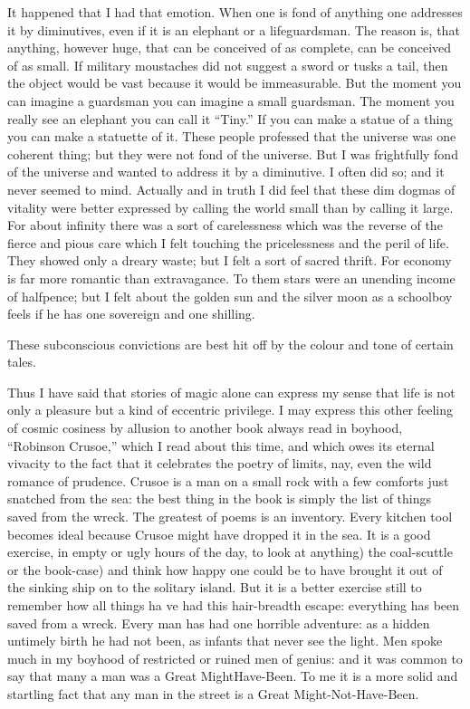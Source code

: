 \documentclass{book}
\begin{document}
It happened that I had that emotion. When one is fond of anything one addresses it by diminutives, even if it is an elephant or a lifeguardsman. The reason is, that anything, however huge, that can be conceived of as complete, can be conceived of as small. If military moustaches did not suggest a sword or tusks a tail, then the object would be vast because it would be immeasurable. But the moment you can imagine a guardsman you can imagine a small guardsman. The moment you really see an elephant you can call it “Tiny.” If you can make a statue of a thing you can make a statuette of it. These people professed that the universe was one coherent thing; but they were not fond of the universe. But I was frightfully fond of the universe and wanted to address it by a diminutive. I often did so; and it never seemed to mind. Actually and in truth I did feel that these dim dogmas of vitality were better expressed by calling the world small than by calling it large. For about infinity there was a sort of carelessness which was the reverse of the fierce and pious care which I felt touching the pricelessness and the peril of life. They showed only a dreary waste; but I felt a sort of sacred thrift. For economy is far more romantic than extravagance. To them stars were an unending income of halfpence; but I felt about the golden sun and the silver moon as a schoolboy feels if he has one sovereign and one shilling.

These subconscious convictions are best hit off by the colour and tone of certain tales.

Thus I have said that stories of magic alone can express my sense that life is not only a pleasure but a kind of eccentric privilege. I may express this other feeling of cosmic cosiness by allusion to another book always read in boyhood, “Robinson Crusoe,” which I read about this time, and which owes its eternal vivacity to the fact that it celebrates the poetry of limits, nay, even the wild romance of prudence. Crusoe is a man on a small rock with a few comforts just snatched from the sea: the best thing in the book is simply the list of things saved from the wreck. The greatest of poems is an inventory. Every kitchen tool becomes ideal because Crusoe might have dropped it in the sea. It is a good exercise, in empty or ugly hours of the day, to look at anything) the coal-scuttle or the book-case) and think how happy one could be to have brought it out of the sinking ship on to the solitary island. But it is a better exercise still to remember how all things ha ve had this hair-breadth escape: everything has been saved from a wreck. Every man has had one horrible adventure: as a hidden untimely birth he had not been, as infants that never see the light. Men spoke much in my boyhood of restricted or ruined men of genius: and it was common to say that many a man was a Great MightHave-Been. To me it is a more solid and startling fact that any man in the street is a Great Might-Not-Have-Been.
\end{document}
